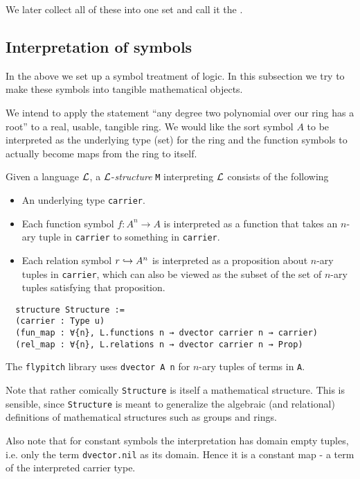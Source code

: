 We later collect all of these into one set and call it the .

\subsection{Interpretation of symbols}

In the above we set up a symbol treatment of logic.
In this subsection we try to make these symbols into tangible mathematical objects.

We intend to apply the statement
``any degree two polynomial over our ring has a root''
to a real, usable, tangible ring.
We would like the sort symbol $A$ to be interpreted as the underlying type (set)
for the ring and the function symbols to actually become maps from the ring to itself.

\begin{dfn}[Structures]
    Given a language $\mathcal{L}$, a $\mathcal{L}$-\textit{structure} \texttt{M}
    interpreting $\mathcal{L}$ consists of the following
    \begin{itemize}
      \item An underlying type \texttt{carrier}.
      \item Each function symbol $f : A^{n} \to A$ is interpreted as a
            function that takes an $n$-ary tuple in \texttt{carrier}
            to something in \texttt{carrier}.
      \item Each relation symbol $r \hookrightarrow A^{n}$
            is interpreted as a proposition about $n$-ary tuples in \texttt{carrier},
            which can also be viewed as the subset of the set of $n$-ary tuples
            satisfying that proposition.
    \end{itemize}

  \begin{lstlisting}
  structure Structure :=
  (carrier : Type u)
  (fun_map : ∀{n}, L.functions n → dvector carrier n → carrier)
  (rel_map : ∀{n}, L.relations n → dvector carrier n → Prop)\end{lstlisting}

  The \texttt{flypitch} library uses \texttt{dvector A n} for $n$-ary tuples of terms in \texttt{A}.

  Note that rather comically \texttt{Structure} is itself a mathematical structure.
  This is sensible, since \texttt{Structure} is meant to generalize the algebraic
  (and relational) definitions of mathematical structures such as groups and rings.

  Also note that for constant symbols the interpretation has domain empty tuples,
  i.e. only the term \texttt{dvector.nil} as its domain. Hence it is a constant map
  - a term of the interpreted carrier type.
\end{dfn}

